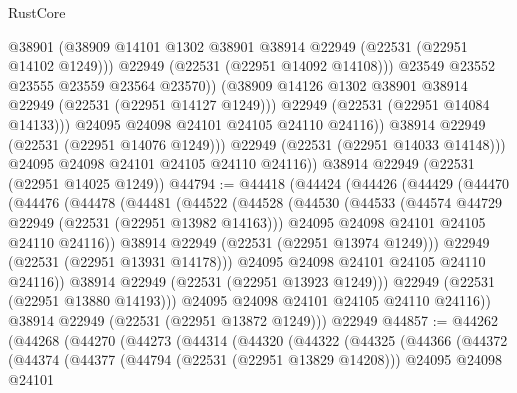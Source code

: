 \begin{lexlean}{RustCore}
\begin{coremodule}
                        @38901
                        (@38909 @14101 @1302 @38901 @38914 @22949 (@22531 (@22951 @14102 @1249)))
                        @22949
                        (@22531 (@22951 @14092 @14108)))
                      @23549
                      @23552
                      @23555
                      @23559
                      @23564
                      @23570))
                  (@38909 @14126 @1302 @38901 @38914 @22949 (@22531 (@22951 @14127 @1249)))
                  @22949
                  (@22531 (@22951 @14084 @14133)))
                @24095
                @24098
                @24101
                @24105
                @24110
                @24116))
            @38914
            @22949
            (@22531 (@22951 @14076 @1249)))
          @22949
          (@22531 (@22951 @14033 @14148)))
        @24095
        @24098
        @24101
        @24105
        @24110
        @24116))
    @38914
    @22949
    (@22531 (@22951 @14025 @1249))
@44794 := @44418
    (@44424
      (@44426
        (@44429
          (@44470
            (@44476
              (@44478
                (@44481
                  (@44522
                    (@44528
                      (@44530
                        (@44533
                          (@44574 @44729 @22949 (@22531 (@22951 @13982 @14163)))
                          @24095
                          @24098
                          @24101
                          @24105
                          @24110
                          @24116))
                      @38914
                      @22949
                      (@22531 (@22951 @13974 @1249)))
                    @22949
                    (@22531 (@22951 @13931 @14178)))
                  @24095
                  @24098
                  @24101
                  @24105
                  @24110
                  @24116))
              @38914
              @22949
              (@22531 (@22951 @13923 @1249)))
            @22949
            (@22531 (@22951 @13880 @14193)))
          @24095
          @24098
          @24101
          @24105
          @24110
          @24116))
      @38914
      @22949
      (@22531 (@22951 @13872 @1249)))
    @22949
@44857 := @44262
    (@44268
      (@44270
        (@44273
          (@44314
            (@44320
              (@44322
                (@44325
                  (@44366
                    (@44372
                      (@44374
                        (@44377
                          (@44794 (@22531 (@22951 @13829 @14208)))
                          @24095
                          @24098
                          @24101

\end{coremodule}
\end{lexlean}
